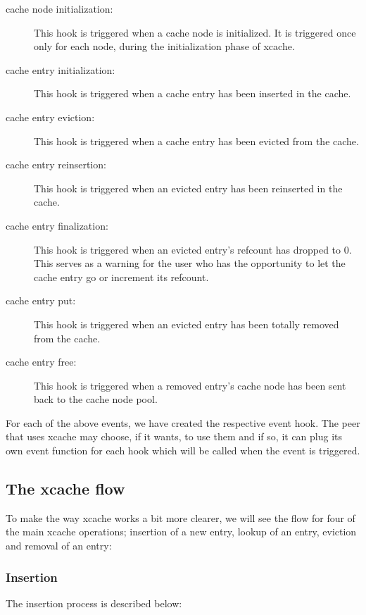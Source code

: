 \begin{description}
\item[cache node initialization:]
	This hook is triggered when a cache node is initialized. It is 
	triggered once only for each node, during the initialization phase of 
	xcache.
\item[cache entry initialization:]
	This hook is triggered when a cache entry has been inserted in the 
	cache.
\item[cache entry eviction:]
	This hook is triggered when a cache entry has been evicted from the 
	cache.
\item[cache entry reinsertion:]
	This hook is triggered when an evicted entry has been reinserted in the 
	cache.
\item[cache entry finalization:]
	This hook is triggered when an evicted entry's refcount has dropped to 
	0. This serves as a warning for the user who has the opportunity to let 
	the cache entry go or increment its refcount.
\item[cache entry put:]
	This hook is triggered when an evicted entry has been totally removed 
	from the cache.
\item[cache entry free:]
	This hook is triggered when a removed entry's cache node has been sent 
	back to the cache node pool.
\end{description}

For each of the above events, we have created the respective event hook. The 
peer that uses xcache may choose, if it wants, to use them and if so, it can 
plug its own event function for each hook which will be called when the event 
is triggered.

\subsection{The xcache flow}\label{sec:xcache-flow-design}

To make the way xcache works a bit more clearer, we will see the flow for four 
of the main xcache operations; insertion of a new entry, lookup of an entry, 
eviction and removal of an entry:

\subsubsection{Insertion}

The insertion process is described below:

